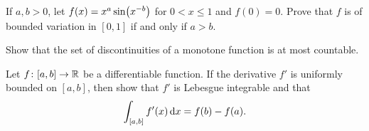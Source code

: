 \documentclass{../homework}
\begin{document}
\begin{problems}
  \begin{solution}
  \end{solution}

\item If \(a, b > 0\), let \(f(x) = x^a \sin\prn*{x^{-b}}\) for
  \(0 < x \le 1\) and \(f(0) = 0\).  Prove that \(f\) is of bounded
  variation in \([0, 1]\) if and only if \(a > b\).

  \begin{solution}
  \end{solution}

\item Show that the set of discontinuities of a monotone function is
  at most countable.

  \begin{solution}
  \end{solution}

\item Let \(f \colon [a, b] \to \mathbb R\) be a differentiable function.
  If the derivative \(f'\) is uniformly bounded on \([a, b]\), then
  show that \(f'\) is Lebesgue integrable and that
  \[
    \int_{[a, b]} f'(x) \mathop{}\!\mathrm d x = f(b) - f(a).
  \]

  \begin{solution}
  \end{solution}

\end{problems}
\end{document}

